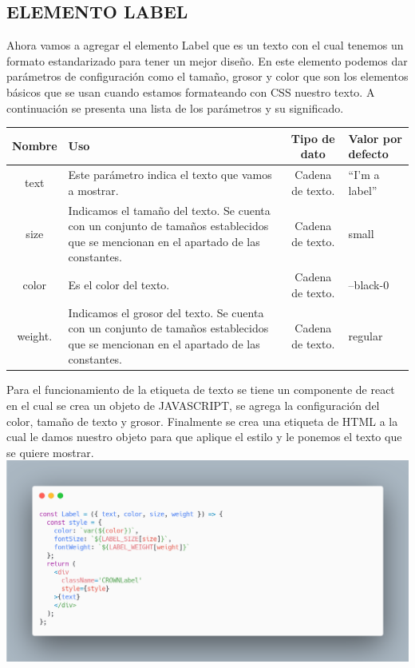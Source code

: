 \subsection{ELEMENTO LABEL}
Ahora vamos a agregar el elemento Label que es un texto con el cual tenemos un formato estandarizado para tener un mejor diseño. En este elemento podemos dar parámetros de configuración como el tamaño, grosor y color que son los elementos básicos que se usan cuando estamos formateando con CSS nuestro texto. 
A continuación se presenta una lista de los parámetros y  su significado.
\newline
\begin{center}
 \begin{tabular}{ | c |  p{5cm}  | c | p{3cm} |} 
 \hline
 \textbf{Nombre} &  \textbf{Uso} &  \textbf{ Tipo de dato} &  \textbf{Valor por defecto}\\ [0.5ex] 
 \hline\hline
text 		& Este parámetro  indica el texto que vamos a mostrar.  &  Cadena de texto. 	& “I’m a label” \\  [2.5ex] 
 \hline
size 	        & Indicamos el tamaño del texto. Se cuenta con un conjunto de tamaños establecidos que se mencionan en el apartado de las constantes.       & Cadena de texto.  	& small \\[2.5ex] 
 \hline
color        & Es el color del texto.						    & Cadena de texto. 	& --black-0 \\[3.5ex] 
 \hline
 weight.   & Indicamos el grosor del texto. Se cuenta con un conjunto de tamaños establecidos que se mencionan en el apartado de las constantes.&  Cadena de texto. 	& regular \\[2.5ex] 
 \hline
\end{tabular}
\end{center}
\newline
\newline
Para el funcionamiento de la etiqueta de texto se tiene un componente de react en el cual se crea un objeto de JAVASCRIPT, se agrega la configuración del color, tamaño de texto y grosor. Finalmente se crea una etiqueta de HTML a la cual le damos nuestro objeto para que aplique el estilo y le ponemos el texto que se quiere mostrar.
\newline
\newline
\includegraphics[width=1\textwidth]{./Imagenes/carbon-11.png}
\newline
\newline



